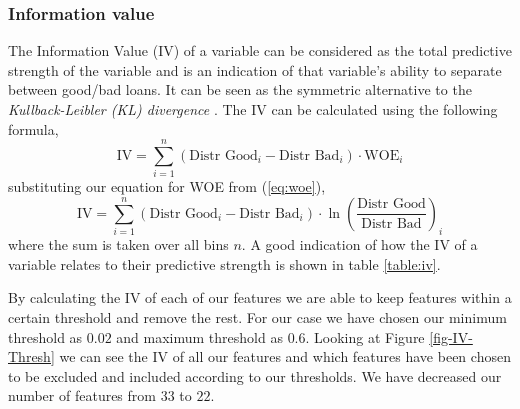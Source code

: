 \subsubsection{Information value}
 The Information Value (IV) \cite{Siddiqi2005CreditRS} of a variable can be considered as the total predictive strength of the variable and is an indication of that variable’s ability to separate between good/bad loans. It can be seen as the symmetric alternative to the \emph{Kullback-Leibler (KL) divergence} \cite{kullback1951information}. The IV can be calculated using the following formula,
 \begin{equation}
    \mbox{IV} =  \sum^{n}_{i=1}(\mbox{Distr Good}_{i} - \mbox{Distr Bad}_{i}) \cdot \mbox{WOE}_{i}
 \end{equation}
 substituting our equation for WOE from (\ref{eq:woe}),
 \begin{equation}
     \mbox{IV} = \sum^{n}_{i=1}(\mbox{Distr Good}_{i} - \mbox{Distr Bad}_{i}) \cdot \ln{\left(\frac{\mbox{Distr Good}}{\mbox{Distr Bad}}\right)}_{i}
 \end{equation}
 where the sum is taken over all bins $n$.
 A good indication of how the IV of a variable relates to their predictive strength is shown in table \ref{table:iv}.
 \begin{table}[h!]
\begin{center}
\shadowbox{\begin{minipage}[t]{0.4\columnwidth}%
    \begin{tabular}{cl}
       \textbf{IV range}  &  \textbf{Interpretation}\\
       \hline\\
        $<0.02$ & Not predictive\\
        $[0.02,0.1)$ & Weak predictive\\
        $[0.1, 0.3)$ & Medium predictive\\
        $[0.3,0.5)$ & Strong predictive\\
        $>0.5$ & Suspicious \\
    \end{tabular}
    \end{minipage}}
\par\end{center}
\caption{IV Interpretation}\label{table:iv}
\end{table}
By calculating the IV of each of our features we are able to keep features within a certain threshold and remove the rest. For our case we have chosen our minimum threshold as $0.02$ and maximum threshold as $0.6$. Looking at Figure \ref{fig-IV-Thresh} we can see the IV of all our features and which features have been chosen to be excluded and included according to our thresholds. We have decreased our number of features from $33$ to $22$.

